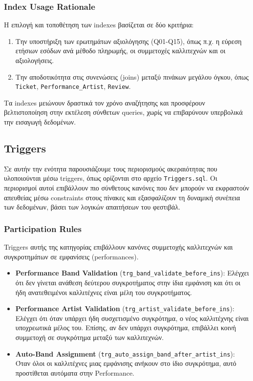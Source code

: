 \documentclass[13pt]{extarticle}
\begin{document}
\subsubsection{Index Usage Rationale}

Η επιλογή και τοποθέτηση των indexes βασίζεται σε δύο κριτήρια:
\begin{enumerate}
    \item Την υποστήριξη των ερωτημάτων αξιολόγησης (Q01-Q15), όπως π.χ. η εύρεση ετήσιων εσόδων ανά μέθοδο πληρωμής, οι συμμετοχές καλλιτεχνών και οι αξιολογήσεις.
    \item Την αποδοτικότητα στις συνενώσεις (joins) μεταξύ πινάκων μεγάλου όγκου, όπως \texttt{Ticket}, \texttt{Performance\_Artist}, \texttt{Review}.
\end{enumerate}
Τα indexes μειώνουν δραστικά τον χρόνο αναζήτησης και προσφέρουν βελτιστοποίηση στην εκτέλεση σύνθετων queries, χωρίς να επιβαρύνουν υπερβολικά την εισαγωγή δεδομένων.

\subsection{Triggers}

Σε αυτήν την ενότητα παρουσιάζουμε τους περιορισμούς ακεραιότητας που υλοποιούνται μέσω triggers, όπως ορίζονται στο αρχείο \texttt{Triggers.sql}. Οι περιορισμοί αυτοί επιβάλλουν πιο σύνθετους κανόνες που δεν μπορούν να εκφραστούν απευθείας μέσω constraints στους πίνακες και εξασφαλίζουν τη δυναμική συνέπεια των δεδομένων, βάσει των λογικών απαιτήσεων του φεστιβάλ.

\subsubsection{Participation Rules}

Triggers αυτής της κατηγορίας επιβάλλουν κανόνες συμμετοχής καλλιτεχνών και συγκροτημάτων σε εμφανίσεις (performances).

\begin{itemize}
    \item \textbf{Performance Band Validation} (\texttt{trg\_band\_validate\_before\_ins}): Ελέγχει ότι δεν γίνεται ανάθεση δεύτερου συγκροτήματος στην ίδια εμφάνιση και ότι οι ήδη ανατεθειμένοι καλλιτέχνες είναι μέλη του συγκροτήματος.
    \item \textbf{Performance Artist Validation} (\texttt{trg\_artist\_validate\_before\_ins}): Ελέγχει ότι όταν υπάρχει ήδη συσχετισμένο συγκρότημα, ο νέος καλλιτέχνης είναι υποχρεωτικά μέλος του. Επίσης, αν δεν υπάρχει συγκρότημα, επιβάλλει κοινή συμμετοχή σε συγκρότημα μεταξύ των καλλιτεχνών.
    \item \textbf{Auto-Band Assignment} (\texttt{trg\_auto\_assign\_band\_after\_artist\_ins}): Όταν όλοι οι καλλιτέχνες μιας εμφάνισης ανήκουν στο ίδιο συγκρότημα, αυτό προστίθεται αυτόματα στην Performance.
\end{itemize}
\end{document}
